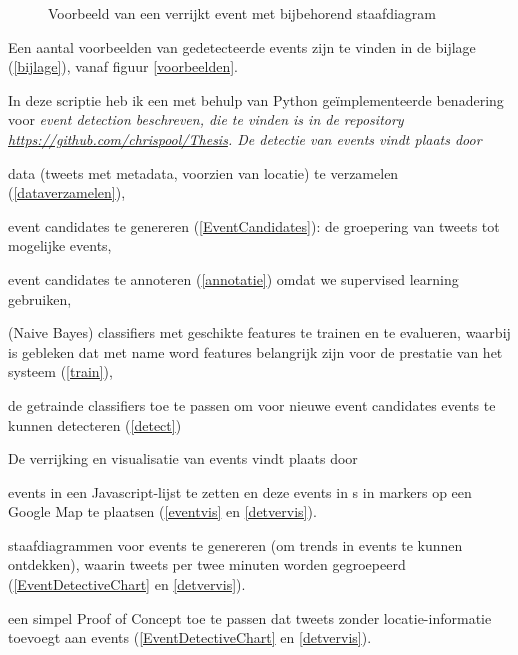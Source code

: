 {{\begin{figure}[H]
  \centering
    \caption{Voorbeeld van een verrijkt event met bijbehorend staafdiagram}
  \label{verrijk}
\end{figure}

Een aantal voorbeelden van gedetecteerde events zijn te vinden in de bijlage (\ref{bijlage}), vanaf figuur \ref{voorbeelden}.

\label{conclusie}

In deze scriptie heb ik een met behulp van Python ge\"implementeerde benadering voor \it{event detection} beschreven, die te vinden is
in de repository \url{https://github.com/chrispool/Thesis}. 
\vl
De detectie van events vindt plaats door 

\begin{bullets}
\item data (tweets met metadata, voorzien van locatie) te verzamelen (\ref{dataverzamelen}),
\item event candidates te genereren (\ref{EventCandidates}): de groepering van tweets tot mogelijke events,
\item event candidates te annoteren (\ref{annotatie}) omdat we supervised learning gebruiken,
\item (Naive Bayes) classifiers met geschikte features te trainen en te evalueren, waarbij is gebleken dat met name word features belangrijk
zijn voor de prestatie van het systeem (\ref{train}),
\item de getrainde classifiers toe te passen om voor nieuwe event candidates events te kunnen detecteren (\ref{detect})
\end{bullets}

De verrijking en visualisatie van events vindt plaats door

\begin{bullets}
\item events in een Javascript-lijst te zetten en deze events in s in markers op een Google Map te plaatsen (\ref{eventvis}
en \ref{detvervis}).
\item staafdiagrammen voor events te genereren (om trends in events te kunnen ontdekken), waarin tweets per twee minuten worden gegroepeerd
(\ref{EventDetectiveChart} en \ref{detvervis}).
\item een simpel Proof of Concept toe te passen dat tweets zonder locatie-informatie toevoegt aan events (\ref{EventDetectiveChart} en
\ref{detvervis}).
\end{bullets}

}}
